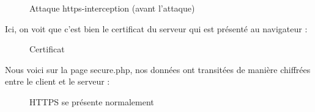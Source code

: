 \begin{figure}[H]
  \caption{Attaque https-interception (avant l'attaque)}
\end{figure}

Ici, on voit que c'est bien le certificat du serveur qui est présenté au navigateur :

\begin{figure}[H]
  \caption{Certificat}
\end{figure}

Nous voici sur la page secure.php, nos données ont transitées de manière chiffrées entre le client et le serveur :

\begin{figure}[H]
  \caption{HTTPS se présente normalement}
\end{figure}


